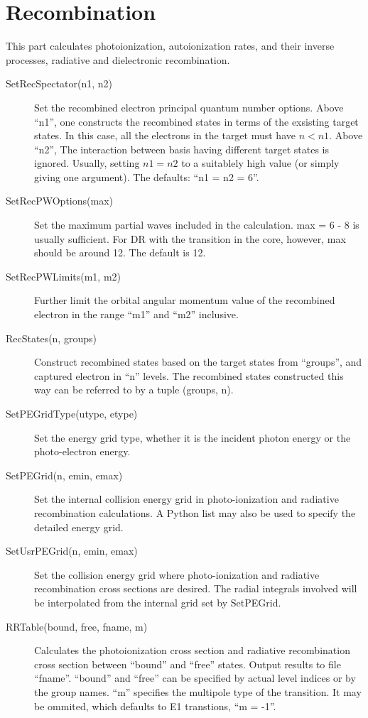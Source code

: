 \documentclass[12pt]{article}
\begin{document}
\section{Recombination}
This part calculates photoionization, autoionization rates, and their inverse
processes, radiative and dielectronic recombination.
\begin{description}
\item[SetRecSpectator(n1, n2)] 
Set the recombined electron principal quantum
number options. Above ``n1'', one constructs the recombined states in terms of
the exsisting target states. In this case, all the electrons in the target
must have $n < n1$. Above ``n2'', The interaction between basis having
different target states is ignored. Usually, setting $n1 = n2$ to a suitablely
high value (or simply giving one argument). The defaults: ``n1 = n2 = 6''.

\item[SetRecPWOptions(max)] 
Set the maximum partial waves included in the
calculation. max = 6 - 8 is usually sufficient. For DR with the transition in
the core, however, max should be around 12. The default is 12.

\item[SetRecPWLimits(m1, m2)] 
Further limit the orbital angular momentum value of the recombined electron
in the range ``m1'' and ``m2'' inclusive.

\item[RecStates(n, groups)] 
Construct recombined states based on the  target
states from ``groups'', and captured electron in ``n'' levels. The recombined
states constructed this way can be referred to by a tuple (groups, n). 

\item[SetPEGridType(utype, etype)]
Set the energy grid type, whether it is the incident photon energy or the
photo-electron energy. 

\item[SetPEGrid(n, emin, emax)] 
Set the internal collision energy grid in photo-ionization and radiative
recombination calculations. A Python list may also be used to specify the
detailed energy grid. 

\item[SetUsrPEGrid(n, emin, emax)]
Set the collision energy grid where photo-ionization and radiative
recombination cross sections are desired. The radial integrals involved will
be interpolated from the internal grid set by SetPEGrid.

\item[RRTable(bound, free, fname, m)] Calculates the photoionization cross
section and radiative recombination cross section between ``bound'' and
``free'' states. Output results to file ``fname''. ``bound'' and ``free'' can
be specified by actual level indices or by the group names. ``m'' specifies
the multipole type of the transition. It may be ommited, which defaults to E1
transtions, ``m = -1''.


\end{description}
\end{document}
